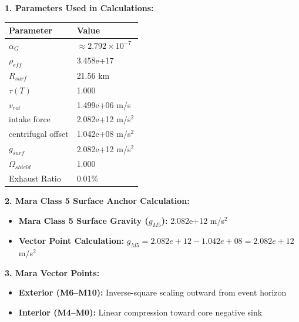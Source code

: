 \documentclass[11pt, a4paper]{article}
\begin{document}
\vspace{0.5em}
\noindent \textbf{1. Parameters Used in Calculations:}
\begin{center}
  \begin{tabular}{|l|l|}
    \hline
    \textbf{Parameter} & \textbf{Value} \\ \hline
    $\alpha_G$ & $\approx 2.792 \times 10^{-7}$ \\ \hline
    $\rho_{eff}$ & 3.458e+17 \\ \hline
    $R_{surf}$ & 21.56 km \\ \hline
    $\tau(T)$ & 1.000 \\ \hline
    $v_{rot}$ & 1.499e+06 m/s \\ \hline
    intake force & 2.082e+12 m/s$^2$ \\ \hline
    centrifugal offset & 1.042e+08 m/s$^2$ \\ \hline
    $g_{surf}$ & 2.082e+12 m/s$^2$ \\ \hline
    $\Omega_{shield}$ & 1.000 \\ \hline
    Exhaust Ratio & 0.01\% \\ \hline
  \end{tabular}
\end{center}

\vspace{0.5em}
\noindent \textbf{2. Mara Class 5 Surface Anchor Calculation:}
\begin{itemize}
  \item \textbf{Mara Class 5 Surface Gravity ($g_{M5}$):} 2.082e+12 m/s$^2$
  \item \textbf{Vector Point Calculation:} $g_{M5} = 2.082e+12 - 1.042e+08 = 2.082e+12$ m/s$^2$
\end{itemize}

\vspace{0.5em}
\noindent \textbf{3. Mara Vector Points:}
\begin{itemize}
  \item \textbf{Exterior (M6--M10):} Inverse-square scaling outward from event horizon
  \item \textbf{Interior (M4--M0):} Linear compression toward core negative sink
\end{itemize}
\end{document}
